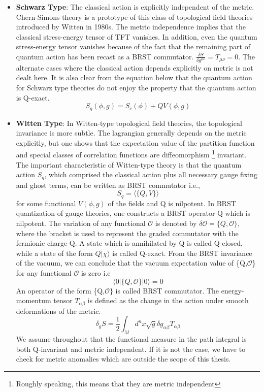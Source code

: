 \begin{itemize} 
\item \textbf{Schwarz Type}: The classical action is explicitly independent of the metric. Chern-Simons theory is a 
prototype of this class of topological field theories introduced by Witten in 1980s. The metric independence implies 
that the classical stress-energy tensor of TFT vanishes. In addition, even the quantum stress-energy tensor vanishes 
because of the fact that the remaining part of quantum action has been recast as a BRST commutator.  
$ \frac{\delta S}{\delta g^{\mu\nu}} = T_{\mu\nu} = 0 $. The alternate cases where the classical action depends 
explicitly on metric is not dealt here. It is also clear from the equation below that the quantum action for Schwarz 
type theories do not enjoy the property that the quantum action is Q-exact. 
\begin{equation}
S_{q}(\phi, g) = S_{c}(\phi) + QV(\phi,g) 
\end{equation}
\item \textbf{Witten Type}: In Witten-type topological field theories, the topological invariance is more subtle. 
The lagrangian generally depends on the metric explicitly, but one shows that the expectation value of the 
partition function and special classes of correlation functions are diffeomorphism \footnote{Roughly speaking, 
this means that they are metric independent} invariant. 
The important characteristic of Witten-type theory is that the quantum action $S_{q}$, which comprised the 
classical action plus all necessary gauge fixing and ghost terms, 
can be written as BRST commutator i.e.,
\begin{equation}
S_{q} = \langle \{Q, V\}\rangle 
\end{equation}
for some functional $V(\phi,g)$ of the fields and Q is nilpotent. 
In BRST quantization of gauge theories, one constructs a BRST operator Q which is nilpotent. 
The variation of any functional $\mathcal{O}$ is denoted by $
\delta\mathcal{O} = \{Q,\mathcal{O}\} $, where the bracket is used to represent the graded commutator 
with the fermionic charge Q. A state which is annihilated by Q is called Q-closed, while a state of the 
form $ Q|\chi\rangle$ is called Q-exact. From the BRST invariance of the vacuum, we can conclude 
that the vacuum expectation value of \{Q,$\mathcal{O}$\} for any functional $\mathcal{O}$ is zero i.e 
\begin{equation}
 \langle 0 | \{Q,\mathcal{O}\} | 0 \rangle  = 0 
 \end{equation}
An operator of the form \{Q,$\mathcal{O}\}$ is called BRST commutator. The energy-momentum tensor 
$T_{\alpha\beta}$ is defined as the change in the action under smooth deformations of the metric.
\begin{equation}
\delta_{g} S = \frac{1}{2} \int_{M} d^{n} x \sqrt{g} \delta g_{\alpha\beta} T_{\alpha\beta}
\end{equation}
We assume throughout that the functional measure in the path integral is both Q-invariant and metric
independent. If it is not the case, we have to check for metric anomalies which are outside the scope of this thesis. 
\end{itemize} 


